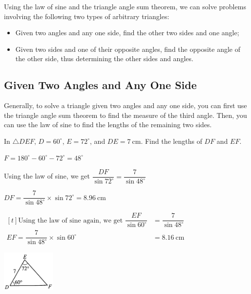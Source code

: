 \documentclass{report}
\begin{document}
Using the law of sine and the triangle angle sum theorem, we can solve problems involving the following two types of arbitrary triangles:
\begin{itemize}
    \item Given two angles and any one side, find the other two sides and one angle;
    \item Given two sides and one of their opposite angles, find the opposite angle of the other side, thus determining the other sides and angles.
\end{itemize}

\subsection*{Given Two Angles and Any One Side}

Generally, to solve a triangle given two angles and any one side, you can first use the triangle angle sum theorem to find the measure of the third angle. Then, you can use the law of sine to find the lengths of the remaining two sides.

\begin{question}
    In $\triangle DEF$, $D=60^\circ$, $E=72^\circ$, and $DE=7 \mathrm{~cm}$. Find the lengths of $DF$ and $EF$.

    \sol{}

    \begin{vwcol}[widths={0.6,0.4}, sep=8mm, rule=0pt,justify=flushleft]
        \noindent $F=180^{\circ}-60^{\circ}-72^{\circ}=48^{\circ}$

    \noindent Using the law of sine, we get $\dfrac{D F}{\sin 72^{\circ}}=\dfrac{7}{\sin 48^{\circ}}$

    \noindent $
    D F=\dfrac{7}{\sin 48^{\circ}} \times \sin 72^{\circ}=8.96 \mathrm{~cm}
    $

    \noindent $\begin{aligned}[t]
        \text{Using the law of sine again, we get }\dfrac{E F}{\sin 60^{\circ}}&=\dfrac{7}{\sin 48^{\circ}}\\
        E F=\dfrac{7}{\sin 48^{\circ}} \times \sin 60^{\circ}&=8.16 \mathrm{~cm}
    \end{aligned}$

    \includegraphics[width=0.2\textwidth]{assets/10-4.jpg}
    \end{vwcol}
\end{question}
\end{document}
